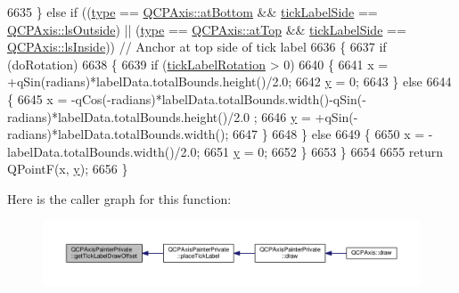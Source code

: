 \begin{DoxyCode}
6635   \} \textcolor{keywordflow}{else} \textcolor{keywordflow}{if} ((\hyperlink{class_q_c_p_axis_painter_private_ae04594e97417336933d807c86d353098}{type} == \hyperlink{class_q_c_p_axis_ae2bcc1728b382f10f064612b368bc18aa220d68888516b6c3b493d144f1ba438f}{QCPAxis::atBottom} && \hyperlink{class_q_c_p_axis_painter_private_a9d27f7625fcfbeb3a60193d0c18fc7e9}{tickLabelSide} == 
      \hyperlink{class_q_c_p_axis_a24b13374b9b8f75f47eed2ea78c37db9a2eadb509fc0c9a8b35b85c86ec9f3c7a}{QCPAxis::lsOutside}) || (\hyperlink{class_q_c_p_axis_painter_private_ae04594e97417336933d807c86d353098}{type} == \hyperlink{class_q_c_p_axis_ae2bcc1728b382f10f064612b368bc18aac0ece2b680d3f545e701f75af1655977}{QCPAxis::atTop} && 
      \hyperlink{class_q_c_p_axis_painter_private_a9d27f7625fcfbeb3a60193d0c18fc7e9}{tickLabelSide} == \hyperlink{class_q_c_p_axis_a24b13374b9b8f75f47eed2ea78c37db9aae7b027ac2839cf4ad611df30236fc3f}{QCPAxis::lsInside})) \textcolor{comment}{// Anchor at top side of tick label}
6636   \{
6637     \textcolor{keywordflow}{if} (doRotation)
6638     \{
6639       \textcolor{keywordflow}{if} (\hyperlink{class_q_c_p_axis_painter_private_ae6ade9232a8e400924009e8edca94bac}{tickLabelRotation} > 0)
6640       \{
6641         x = +qSin(radians)*labelData.totalBounds.height()/2.0;
6642         \hyperlink{_comparision_pictures_2_createtest_image_8m_a2fb1c5cf58867b5bbc9a1b145a86f3a0}{y} = 0;
6643       \} \textcolor{keywordflow}{else}
6644       \{
6645         x = -qCos(-radians)*labelData.totalBounds.width()-qSin(-radians)*labelData.totalBounds.height()/2.0
      ;
6646         \hyperlink{_comparision_pictures_2_createtest_image_8m_a2fb1c5cf58867b5bbc9a1b145a86f3a0}{y} = +qSin(-radians)*labelData.totalBounds.width();
6647       \}
6648     \} \textcolor{keywordflow}{else}
6649     \{
6650       x = -labelData.totalBounds.width()/2.0;
6651       \hyperlink{_comparision_pictures_2_createtest_image_8m_a2fb1c5cf58867b5bbc9a1b145a86f3a0}{y} = 0;
6652     \}
6653   \}
6654   
6655   \textcolor{keywordflow}{return} QPointF(x, \hyperlink{_comparision_pictures_2_createtest_image_8m_a2fb1c5cf58867b5bbc9a1b145a86f3a0}{y});
6656 \}
\end{DoxyCode}


Here is the caller graph for this function\+:\nopagebreak
\begin{figure}[H]
\begin{center}
\leavevmode
\includegraphics[width=350pt]{class_q_c_p_axis_painter_private_a6b02e6fd70cc65f726ca8cb3e6f16de4_icgraph}
\end{center}
\end{figure}


